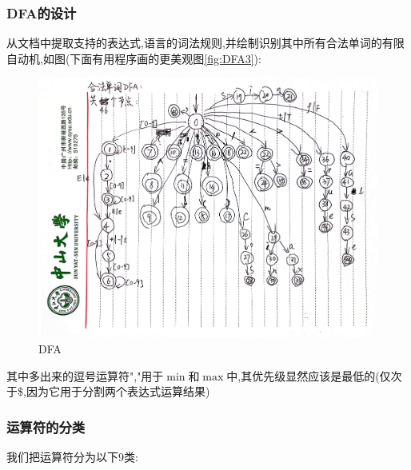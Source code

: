 \documentclass{article}
\begin{document}
\subsubsection{DFA的设计}
从文档中提取支持的表达式,语言的词法规则,并绘制识别其中所有合法单词的有限自动机,如图(下面有用程序画的更美观图\ref{fig:DFA3}):
\begin{figure}[H]
    \centering
    \includegraphics[width=0.9\linewidth]{DFA2.png}
    \caption{DFA}
    \label{fig:DFA}
\end{figure}

其中多出来的逗号运算符","用于$\min$和$\max$中,其优先级显然应该是最低的(仅次于\$,因为它用于分割两个表达式运算结果)
\newpage
\subsubsection{运算符的分类} 我们把运算符分为以下9类:
\end{document}
